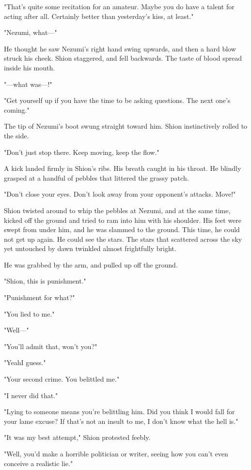 "That's quite some recitation for an amateur. Maybe you do have a talent
for acting after all. Certainly better than yesterday's kiss, at least."

"Nezumi, what---"

He thought he saw Nezumi's right hand swing upwards, and then a hard
blow struck his cheek. Shion staggered, and fell backwards. The taste of
blood spread inside his mouth.

"---what was---!"

"Get yourself up if you have the time to be asking questions. The next
one's coming."

The tip of Nezumi's boot swung straight toward him. Shion instinctively
rolled to the side.

"Don't just stop there. Keep moving, keep the flow."

A kick landed firmly in Shion's ribs. His breath caught in his throat.
He blindly grasped at a handful of pebbles that littered the grassy
patch.

"Don't close your eyes. Don't look away from your opponent's attacks.
Move!"

Shion twisted around to whip the pebbles at Nezumi, and at the same
time, kicked off the ground and tried to ram into him with his shoulder.
His feet were swept from under him, and he was slammed to the ground.
This time, he could not get up again. He could see the stars. The stars
that scattered across the sky yet untouched by dawn twinkled almost
frightfully bright.

He was grabbed by the arm, and pulled up off the ground.

"Shion, this is punishment."

"Punishment for what?"

"You lied to me."

"Well---"

"You'll admit that, won't you?"

"Yeah\el I guess."

"Your second crime. You belittled me."

"I never did that."

"Lying to someone means you're belittling him. Did you think I would
fall for your lame excuse? If that's not an insult to me, I don't know
what the hell is."

"It was my best attempt," Shion protested feebly.

"Well, you'd make a horrible politician or writer, seeing how you can't
even conceive a realistic lie."

